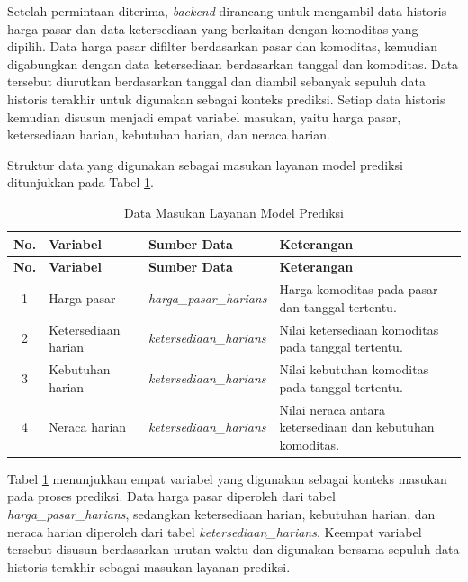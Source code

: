 Setelah permintaan diterima, \textit{backend} dirancang untuk mengambil data historis harga pasar dan data ketersediaan yang berkaitan dengan komoditas yang dipilih. Data harga pasar difilter berdasarkan pasar dan komoditas, kemudian digabungkan dengan data ketersediaan berdasarkan tanggal dan komoditas. Data tersebut diurutkan berdasarkan tanggal dan diambil sebanyak sepuluh data historis terakhir untuk digunakan sebagai konteks prediksi. Setiap data historis kemudian disusun menjadi empat variabel masukan, yaitu harga pasar, ketersediaan harian, kebutuhan harian, dan neraca harian.

Struktur data yang digunakan sebagai masukan layanan model prediksi ditunjukkan pada Tabel \ref{tab:input-prediksi}.

\begin{longtable}{|c|p{3.2cm}|p{4cm}|p{3.2cm}|}
\caption{Data Masukan Layanan Model Prediksi}
\label{tab:input-prediksi} \\
\hline
\textbf{No.} & \textbf{Variabel} & \textbf{Sumber Data} & \textbf{Keterangan} \\
\hline
\endfirsthead

\hline
\textbf{No.} & \textbf{Variabel} & \textbf{Sumber Data} & \textbf{Keterangan} \\
\hline
\endhead

1 & Harga pasar & \textit{harga\allowbreak\_pasar\allowbreak\_harians} & Harga komoditas pada pasar dan tanggal tertentu. \\ \hline
2 & Ketersediaan harian & \textit{ketersediaan\allowbreak\_harians} & Nilai ketersediaan komoditas pada tanggal tertentu. \\ \hline
3 & Kebutuhan harian & \textit{ketersediaan\allowbreak\_harians} & Nilai kebutuhan komoditas pada tanggal tertentu. \\ \hline
4 & Neraca harian & \textit{ketersediaan\allowbreak\_harians} & Nilai neraca antara ketersediaan dan kebutuhan komoditas. \\ \hline

\end{longtable}

Tabel \ref{tab:input-prediksi} menunjukkan empat variabel yang digunakan sebagai konteks masukan pada proses prediksi. Data harga pasar diperoleh dari tabel \textit{harga\allowbreak\_pasar\allowbreak\_harians}, sedangkan ketersediaan harian, kebutuhan harian, dan neraca harian diperoleh dari tabel \textit{ketersediaan\allowbreak\_harians}. Keempat variabel tersebut disusun berdasarkan urutan waktu dan digunakan bersama sepuluh data historis terakhir sebagai masukan layanan prediksi.


